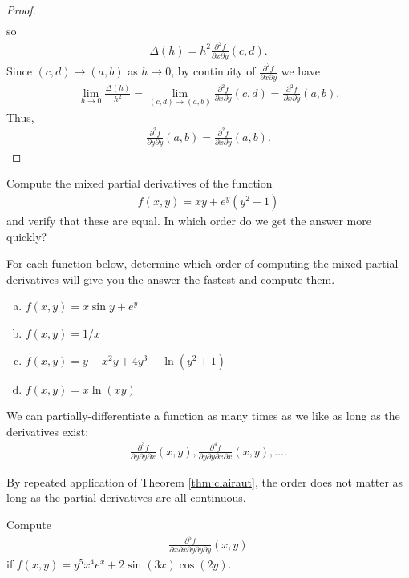 \documentclass[12pt,letterpaper,reqno]{article}
\numberwithin{equation}{section}
\begin{document}
{\begin{proof}
\begin{align*}
	\end{align*}
	so 
	\begin{align*}
	\Delta(h)=h^2\frac{\partial^2 f}{\partial x \partial y}(c,d).
	\end{align*}
	Since $(c,d) \to (a,b)$ as $h \to 0$, by continuity of $\frac{\partial^2 f}{\partial x \partial y}$ we have
	\begin{align*}
		\lim_{h \to 0}\frac{\Delta(h)}{h^2}=\lim_{(c,d) \to (a,b)}\frac{\partial^2 f}{\partial x \partial y}(c,d)=\frac{\partial^2 f}{\partial x \partial y}(a,b).
	\end{align*}
	Thus,
	\begin{align*}
		\frac{\partial^2 f}{\partial y \partial y}(a,b)=\frac{\partial^2 f}{\partial x \partial y}(a,b).
	\end{align*}
\end{proof}

\begin{exercise}
Compute the mixed partial derivatives of the function
\begin{align*}
	f(x,y)=xy+e^y(y^2+1)
\end{align*}	
and verify that these are equal. In which order do we get the answer more quickly?
\end{exercise}

\begin{exercise}
For each function below, determine which order of computing the mixed partial derivatives will give you the answer the fastest and compute them.
\begin{enumerate}[(a)]
	\item $f(x,y)=x\sin y+e^y$
	\item $f(x,y)=1/x$
	\item $f(x,y)=y+x^2y+4y^3-\ln(y^2+1)$
	\item $f(x,y)=x\ln(xy)$
\end{enumerate}
\end{exercise}
We can partially-differentiate a function as many times as we like as long as the derivatives exist:
\begin{align*}
	\frac{\partial^3 f}{\partial y \partial y \partial x}(x,y), \frac{\partial^4 f}{\partial y \partial y \partial x \partial x}(x,y),\dots.
\end{align*}

By repeated application of Theorem \ref{thm:clairaut}, the order does not matter as long as the partial derivatives are all continuous.


\begin{exercise}
Compute 
\begin{align*}
	\frac{\partial^5 f}{\partial x \partial x \partial y \partial y \partial y}(x,y)
\end{align*}
if $f(x,y)=y^5x^4e^x+2\sin(3x)\cos(2y)$.	
\end{exercise}

}
\end{document}
